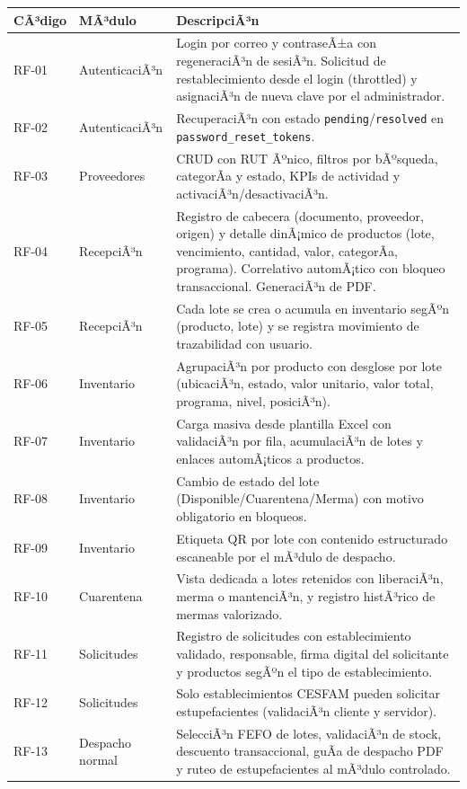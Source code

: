 ﻿\documentclass[a4paper, 12pt]{article}
\begin{document}
\begin{longtable}{@{}p{1.2cm} p{4.2cm} X@{}}
\toprule
\textbf{CÃ³digo} & \textbf{MÃ³dulo} & \textbf{DescripciÃ³n} \\
\midrule
\endhead
RF-01 & AutenticaciÃ³n & Login por correo y contraseÃ±a con regeneraciÃ³n de sesiÃ³n. Solicitud de restablecimiento desde el login (throttled) y asignaciÃ³n de nueva clave por el administrador. \\
RF-02 & AutenticaciÃ³n & RecuperaciÃ³n con estado \texttt{pending}/\texttt{resolved} en \texttt{password\_reset\_tokens}. \\
RF-03 & Proveedores & CRUD con RUT Ãºnico, filtros por bÃºsqueda, categorÃ­a y estado, KPIs de actividad y activaciÃ³n/desactivaciÃ³n. \\
RF-04 & RecepciÃ³n & Registro de cabecera (documento, proveedor, origen) y detalle dinÃ¡mico de productos (lote, vencimiento, cantidad, valor, categorÃ­a, programa). Correlativo automÃ¡tico con bloqueo transaccional. GeneraciÃ³n de PDF. \\
RF-05 & RecepciÃ³n & Cada lote se crea o acumula en inventario segÃºn (producto, lote) y se registra movimiento de trazabilidad con usuario. \\
RF-06 & Inventario & AgrupaciÃ³n por producto con desglose por lote (ubicaciÃ³n, estado, valor unitario, valor total, programa, nivel, posiciÃ³n). \\
RF-07 & Inventario & Carga masiva desde plantilla Excel con validaciÃ³n por fila, acumulaciÃ³n de lotes y enlaces automÃ¡ticos a productos. \\
RF-08 & Inventario & Cambio de estado del lote (Disponible/Cuarentena/Merma) con motivo obligatorio en bloqueos. \\
RF-09 & Inventario & Etiqueta QR por lote con contenido estructurado escaneable por el mÃ³dulo de despacho. \\
RF-10 & Cuarentena & Vista dedicada a lotes retenidos con liberaciÃ³n, merma o mantenciÃ³n, y registro histÃ³rico de mermas valorizado. \\
RF-11 & Solicitudes & Registro de solicitudes con establecimiento validado, responsable, firma digital del solicitante y productos segÃºn el tipo de establecimiento. \\
RF-12 & Solicitudes & Solo establecimientos CESFAM pueden solicitar estupefacientes (validaciÃ³n cliente y servidor). \\
RF-13 & Despacho normal & SelecciÃ³n FEFO de lotes, validaciÃ³n de stock, descuento transaccional, guÃ­a de despacho PDF y ruteo de estupefacientes al mÃ³dulo controlado. \\

\end{longtable}
\end{document}
